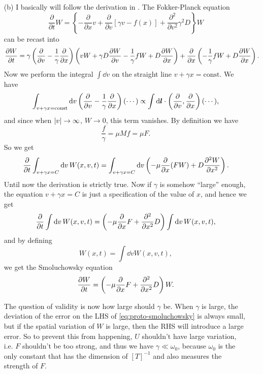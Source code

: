 \documentclass[hyperref, a4paper]{article}
\newcommand*{\const}{\mathrm{const}}
\begin{document}
\begin{itemize}
\item[(b)] I basically will follow the derivation in \cite{kramers1940284}. 
The Fokker-Planck equation 
\begin{equation}
    \frac{\partial}{\partial t} W=\left\{-\frac{\partial}{\partial x} v+\frac{\partial}{\partial v}[\gamma v-f(x)]+\frac{\partial^2}{\partial v^2} \gamma^2 D\right\} W
\end{equation}
can be recast into 
\[
    \pdv{W}{t} = \gamma \left( \pdv{v} - \frac{1}{\gamma} \pdv{x} \right)
    \left( vW + \gamma D \pdv{W}{v} - \frac{1}{\gamma} f W + D \pdv{W}{x} \right) 
    + \pdv{x} \left( - \frac{1}{\gamma} f W + D \pdv{W}{x} \right).
\]
Now we perform the integral $\int \dd{v}$ on the straight line $v + \gamma x = \const$.
We have 
\[
    \int_{v + \gamma x = \const} \dd{v} \left( \pdv{v} - \frac{1}{\gamma} \pdv{x} \right) (\cdots) 
    \propto \int \dd{\vb*{l}} \cdot \left( \pdv{v}, \pdv{x} \right) (\cdots),
\]
and since when $\abs{v} \to \infty$, $W \to 0$,
this term vanishes.
By definition we have 
\[
    \frac{f}{\gamma} = \mu M f = \mu F.
\]
So we get 
\[
    \pdv{t} \int_{v + \gamma x = C} \dd{v} W(x, v, t) = 
    \int_{v + \gamma x = C} \dd{v} \left( - \mu \pdv{x} (F W) + D \pdv[2]{W}{x} \right).
\]
Until now the derivation is strictly true.
Now if $\gamma$ is somehow ``large'' enough, 
the equation $v + \gamma x = C$ is just a specification of the value of $x$,
and hence we get 
\begin{equation}
    \pdv{t} \int \dd{v} W(x, v, t) = \left( - \mu \pdv{x} F + \pdv[2]{x} D \right) \int \dd{v} W(x, v, t),
    \label{eq:proto-smoluchowsky}
\end{equation}
and by defining 
\begin{equation}
    W(x, t) = \int \dd{v} W(x, v, t),
\end{equation}
we get the Smoluchowsky equation
\begin{equation}
    \pdv{W}{t} = \left( - \mu \pdv{x} F + \pdv[2]{x} D \right) W.
\end{equation}

The question of validity is now how large should $\gamma$ be. 
When $\gamma$ is large, the deviation of the error on the LHS of \eqref{eq:proto-smoluchowsky} is always small,
but if the spatial variation of $W$ is large, then the RHS will introduce a large error.
So to prevent this from happening, $U$ shouldn't have large variation, i.e. $F$ shouldn't be too strong,
and thus we have $\gamma \ll \omega_0$,
because $\omega_0$ is the only constant that has the dimension of $[T]^{-1}$
and also measures the strength of $F$.


\end{itemize}
\end{document}
